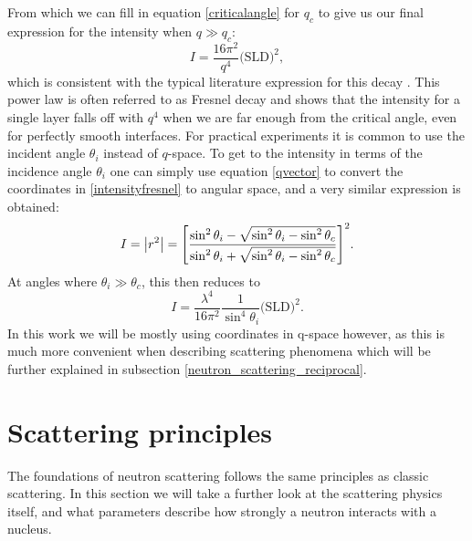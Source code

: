 From which we can fill in equation \ref{criticalangle} for $q_c$ to give us our final expression for the intensity when $q \gg q_c$:
\begin{equation}
	I = \frac{16 \pi^2}{q^4} \textrm{(SLD)}^2,
\end{equation}
which is consistent with the typical literature expression for this decay \cite{ILLq4}. This power law is often referred to as Fresnel decay \cite{fresnel_decay} and shows that the intensity for a single layer falls off with $q^4$ when we are far enough from the critical angle, even for perfectly smooth interfaces. For practical experiments it is common to use the incident angle $\theta_i$ instead of $q$-space. To get to the intensity in terms of the incidence angle  $\theta_i$ one can simply use equation \ref{qvector} to convert the coordinates in \ref{intensityfresnel} to angular space, and a very similar expression is obtained:
\begin{equation}\label{intensityfresnel_angular}
	I = \abs{r^2} = \qty [\frac{\sin^{2}\theta_i - \sqrt{\sin^{2}\theta_i - \sin^{2}\theta_c}}{\sin^{2}\theta_i + \sqrt{\sin^{2}\theta_i - \sin^{2}\theta_c}}]^2.
\end{equation}
At angles where $\theta_i \gg \theta_c$, this then reduces to 
\begin{equation}
	I = \frac{\lambda^4}{16\pi^2} \frac{1}{\sin^{4}\theta_i}  \textrm{(SLD)}^2.
\end{equation}
In this work we will be mostly using coordinates in q-space however, as this is much more convenient when describing scattering phenomena which will be further explained in subsection \ref{neutron_scattering_reciprocal}.
\clearpage
\section{Scattering principles}
The foundations of neutron scattering follows the same principles as classic scattering. In this section we will take a further look at the scattering physics itself, and what parameters describe how strongly a neutron interacts with a nucleus.

